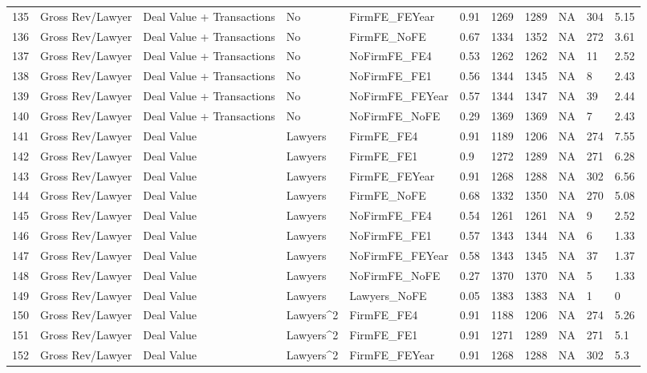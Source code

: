 \documentclass{article}
\begin{document}
\begin{table}[H]
\begin{tabular}{rllllllllll}
  135 & Gross Rev/Lawyer & Deal Value + Transactions & No & FirmFE\_FEYear & 0.91 & 1269 & 1289 & NA & 304 & 5.15 \\
  136 & Gross Rev/Lawyer & Deal Value + Transactions & No & FirmFE\_NoFE & 0.67 & 1334 & 1352 & NA & 272 & 3.61 \\
  137 & Gross Rev/Lawyer & Deal Value + Transactions & No & NoFirmFE\_FE4 & 0.53 & 1262 & 1262 & NA & 11 & 2.52 \\
  138 & Gross Rev/Lawyer & Deal Value + Transactions & No & NoFirmFE\_FE1 & 0.56 & 1344 & 1345 & NA & 8 & 2.43 \\
  139 & Gross Rev/Lawyer & Deal Value + Transactions & No & NoFirmFE\_FEYear & 0.57 & 1344 & 1347 & NA & 39 & 2.44 \\
  140 & Gross Rev/Lawyer & Deal Value + Transactions & No & NoFirmFE\_NoFE & 0.29 & 1369 & 1369 & NA & 7 & 2.43 \\
  141 & Gross Rev/Lawyer & Deal Value & Lawyers & FirmFE\_FE4 & 0.91 & 1189 & 1206 & NA & 274 & 7.55 \\
  142 & Gross Rev/Lawyer & Deal Value & Lawyers & FirmFE\_FE1 & 0.9 & 1272 & 1289 & NA & 271 & 6.28 \\
  143 & Gross Rev/Lawyer & Deal Value & Lawyers & FirmFE\_FEYear & 0.91 & 1268 & 1288 & NA & 302 & 6.56 \\
  144 & Gross Rev/Lawyer & Deal Value & Lawyers & FirmFE\_NoFE & 0.68 & 1332 & 1350 & NA & 270 & 5.08 \\
  145 & Gross Rev/Lawyer & Deal Value & Lawyers & NoFirmFE\_FE4 & 0.54 & 1261 & 1261 & NA & 9 & 2.52 \\
  146 & Gross Rev/Lawyer & Deal Value & Lawyers & NoFirmFE\_FE1 & 0.57 & 1343 & 1344 & NA & 6 & 1.33 \\
  147 & Gross Rev/Lawyer & Deal Value & Lawyers & NoFirmFE\_FEYear & 0.58 & 1343 & 1345 & NA & 37 & 1.37 \\
  148 & Gross Rev/Lawyer & Deal Value & Lawyers & NoFirmFE\_NoFE & 0.27 & 1370 & 1370 & NA & 5 & 1.33 \\
  149 & Gross Rev/Lawyer & Deal Value & Lawyers & Lawyers\_NoFE & 0.05 & 1383 & 1383 & NA & 1 & 0 \\
  150 & Gross Rev/Lawyer & Deal Value & Lawyers^2 & FirmFE\_FE4 & 0.91 & 1188 & 1206 & NA & 274 & 5.26 \\
  151 & Gross Rev/Lawyer & Deal Value & Lawyers^2 & FirmFE\_FE1 & 0.91 & 1271 & 1289 & NA & 271 & 5.1 \\
  152 & Gross Rev/Lawyer & Deal Value & Lawyers^2 & FirmFE\_FEYear & 0.91 & 1268 & 1288 & NA & 302 & 5.3 \\

\end{tabular}
\end{table}
\end{document}
